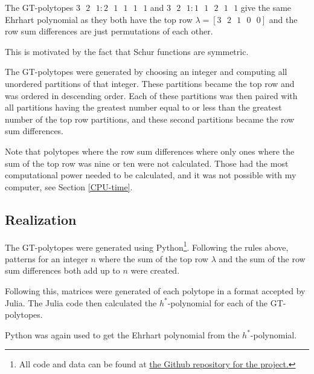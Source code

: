 	
	\begin{example}
		The GT-polytopes 
		$3\text{ }2\text{ }1 : 2\text{ }1\text{ }1\text{ }1\text{ }1$ and 
		$3\text{ }2\text{ }1 : 1\text{ }1\text{ }2\text{ }1\text{ }1$
		give the same Ehrhart polynomial as they both have the top row 
		$\lambda = [3\text{ }2\text{ }1\text{ }0\text{ }0]$ and the row sum differences 
		are just permutations of each other. 
		
		This is motivated by the fact that Schur functions are symmetric.
	\end{example}
	
	\bigskip
	
	The GT-polytopes were generated by choosing an integer and computing all 
	unordered partitions of that integer. These partitions became the top row 
	and was ordered in descending order. Each of these partitions was then paired 
	with all partitions having the greatest number equal to or less than the greatest 
	number of the top row partitions, and these second partitions became the row sum differences. 
	
	\bigskip
	
	Note that polytopes where the row sum differences where only ones where the sum of the top row was nine or ten 
	were not calculated. 
	Those had the most computational power needed to be calculated, and it was not possible with 
	my computer, see Section \ref{CPU-time}. 
	
\subsection{Realization}
		
	The GT-polytopes were generated using Python\footnote{All code and 
	data can be found at 
	\href{https://github.com/oskarhogman/kandidatprojekt-matte/tree/main/Code}{the Github repository for the project.}}.
	Following the rules above, patterns for an integer $n$ where the sum of the top row 
	$\lambda$ and the sum of the row sum differences both add up to $n$ were created. 
	
	Following this, matrices were generated of each polytope in a format accepted by 
	Julia. The Julia code then calculated the $h^*$-polynomial for each of 
	the GT-polytopes.
	 
	Python was again used to get the Ehrhart polynomial from the $h^*$-polynomial.
	